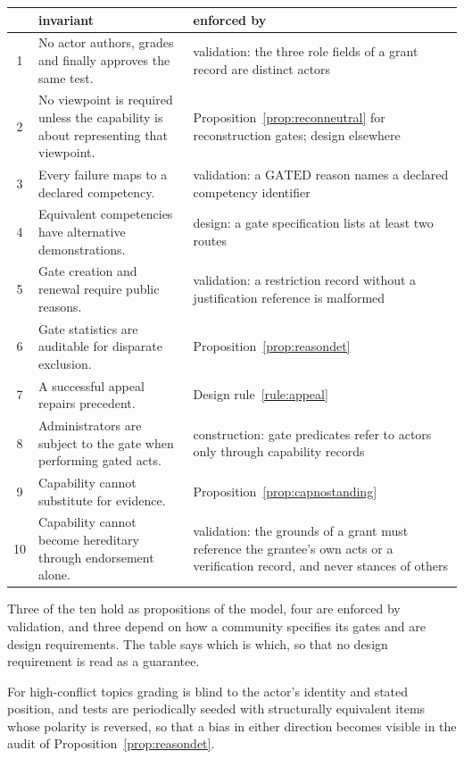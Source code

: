 \begin{center}
\small
\begin{tabularx}{\textwidth}{@{}c X X@{}}
\toprule
& invariant & enforced by\\
\midrule
1 & No actor authors, grades and finally approves the same test. & validation: the three role fields of a grant record are distinct actors\\
2 & No viewpoint is required unless the capability is about representing that viewpoint. & Proposition~\ref{prop:reconneutral} for reconstruction gates; design elsewhere\\
3 & Every failure maps to a declared competency. & validation: a $\mathrm{GATED}$ reason names a declared competency identifier\\
4 & Equivalent competencies have alternative demonstrations. & design: a gate specification lists at least two routes\\
5 & Gate creation and renewal require public reasons. & validation: a restriction record without a justification reference is malformed\\
6 & Gate statistics are auditable for disparate exclusion. & Proposition~\ref{prop:reasondet}\\
7 & A successful appeal repairs precedent. & Design rule~\ref{rule:appeal}\\
8 & Administrators are subject to the gate when performing gated acts. & construction: gate predicates refer to actors only through capability records\\
9 & Capability cannot substitute for evidence. & Proposition~\ref{prop:capnostanding}\\
10 & Capability cannot become hereditary through endorsement alone. & validation: the grounds of a grant must reference the grantee's own acts or a verification record, and never stances of others\\
\bottomrule
\end{tabularx}
\end{center}

Three of the ten hold as propositions of the model, four are enforced by validation, and three depend on how a community specifies its gates and are design requirements. The table says which is which, so that no design requirement is read as a guarantee.

\begin{designrule}\label{rule:blind}
For high-conflict topics grading is blind to the actor's identity and stated position, and tests are periodically seeded with structurally equivalent items whose polarity is reversed, so that a bias in either direction becomes visible in the audit of Proposition~\ref{prop:reasondet}.
\end{designrule}
